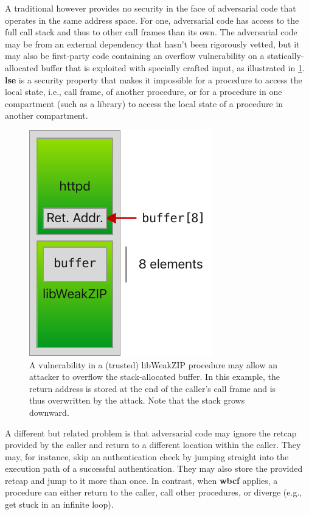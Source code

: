 \documentclass[main.tex]{subfiles}
\begin{document}
A traditional \cc{} however provides no security in the face of adversarial code that operates in the same address space. For one, adversarial code has access to the full call stack and thus to other call frames than its own. The adversarial code may be from an external dependency that hasn't been rigorously vetted, but it may also be first-party code containing an overflow vulnerability on a statically-allocated buffer that is exploited with specially crafted input, as illustrated in \cref{fig:buffoverflow}. \textbf{\Gls{lse}} is a security property that makes it impossible for a procedure to access the local state, i.e., call frame, of another procedure, or for a procedure in one compartment (such as a library) to access the local state of a procedure in another compartment.

\begin{figure}
	\begin{center}
		\includegraphics{Images/Buffer Overflow.pdf}
	\end{center}
	\caption{A vulnerability in a (trusted) libWeakZIP procedure may allow an attacker to overflow the stack-allocated buffer. In this example, the return address is stored at the end of the caller's call frame and is thus overwritten by the attack. Note that the stack grows downward.}
	\label{fig:buffoverflow}
\end{figure}

A different but related problem is that adversarial code may ignore the \gls{retcap} provided by the caller and return to a different location within the caller. They may, for instance, skip an authentication check by jumping straight into the execution path of a successful authentication. They may also store the provided \gls{retcap} and jump to it more than once. In contrast, when \textbf{\gls{wbcf}} applies, a procedure can either return to the caller, call other procedures, or diverge (e.g., get stuck in an infinite loop).
\end{document}
